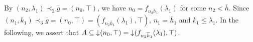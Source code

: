 \documentclass[preprint,12pt]{elsarticle}
\numberwithin{equation}{section}
\newcommand{\dn}{\mathord{\downarrow}\hspace{0.05em}}
\begin{document}







By $(n_{2},\lambda_{1})\prec_{2}\overline{g}=(n_{0},\top)$, we have $n_{0}=f_{n_{2}\overline{h}_{1}}(\lambda_{1})$ for some $n_{2}<\overline{h}$.
Since $(n_{1},k_{1})\prec_{3}\overline{g}=(n_{0},\top)=(f_{n_{2}\overline{h}_{1}}(\lambda_{1}),\top)$, $n_{1}=\overline{h}_{1}$ and $k_{1}\leq\lambda_{1}$.
In the following, we assert that $A\subseteq\dn(n_{0},\top)=\dn(f_{n_{2}\overline{h}_{1}}(\lambda_{1}),\top)$.
\end{document}
